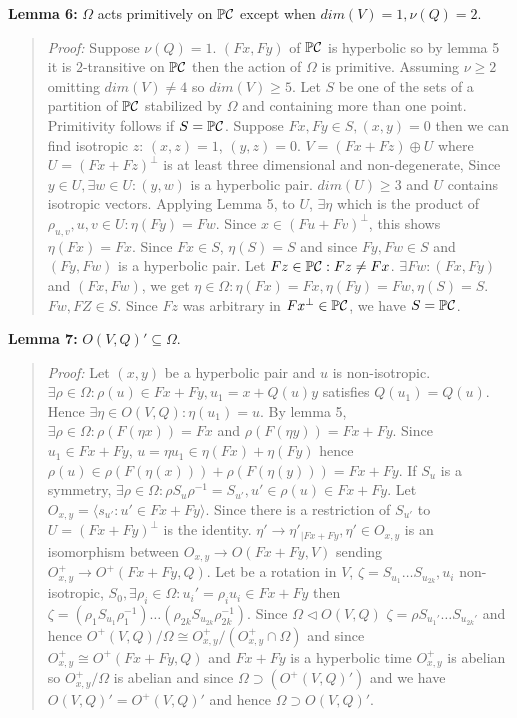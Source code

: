 {\bf Lemma 6:}
$\Omega$ acts primitively on ${\mathbb P}{\cal C}$ except when $dim(V)=1, \nu(Q)=2$.
\begin{quote}
\emph{Proof:}  
Suppose $\nu(Q)=1$.  $(Fx, Fy)$ of ${\mathbb P}{\cal C}$ is hyperbolic so by lemma 5 it is $2$-transitive
on ${\mathbb P}{\cal C}$ then the action of $\Omega$ is primitive.
Assuming $\nu \ge 2$ omitting $dim(V) \ne 4$ so $dim(V) \ge 5$.  Let $S$ be one of the sets
of a partition of ${\mathbb P}{\cal C}$ stabilized by $\Omega$ and containing more than one point.
Primitivity follows if $S={\mathbb P}{\cal C}$.  Suppose $Fx, Fy \in S, (x,y)=0$ then we can find isotropic
$z$: $(x,z)= 1$, $(y, z)=0$.  $V= (Fx + Fz) \oplus U$ where $U= (Fx +Fz)^{\perp}$ is at
least three dimensional and non-degenerate,  Since $y \in U, \exists w \in U: (y, w)$ is
a hyperbolic pair.  $dim(U) \ge 3$ and $U$ contains isotropic vectors.  Applying Lemma 5,
to $U$, $\exists \eta$ which is the product of $\rho_{u,v}, u,v \in U: \eta(Fy)= Fw$.
Since $x \in (Fu + Fv)^{\perp}$, this shows $\eta(Fx)= Fx$.  Since $Fx \in S$,
$\eta(S) = S$ and since $Fy, Fw \in S$ and $(Fy, Fw)$ is  a hyperbolic pair.
Let $Fz \in {\mathbb P}{\cal C}: Fz \ne Fx$.  $\exists Fw: (Fx, Fy)$ and $(Fx, Fw)$, we get
$\eta \in \Omega: \eta(Fx)= Fx, \eta(Fy)= Fw, \eta(S)= S$.
$Fw, FZ \in S$.  Since $Fz$ was arbitrary in $Fx^{\perp} \in {\mathbb P}{\cal C}$, we have $S= {\mathbb P}{\cal C}$.
\end{quote}
{\bf Lemma 7:}
$ O(V,Q)' \subseteq \Omega $.
\begin{quote}
\emph{Proof:}  
Let $(x, y)$ be a hyperbolic pair and $u$ is non-isotropic.  
$\exists \rho \in \Omega: \rho(u) \in Fx + Fy, u_1 = x + Q(u)y$
satisfies $Q(u_1 ) = Q(u)$.  Hence $\exists \eta \in O(V, Q): \eta(u_1 ) =u$.  By lemma 5, 
$\exists \rho \in \Omega: \rho(F(\eta x))= Fx$ and $\rho(F(\eta y)) = Fx + Fy$.
Since $u_1 \in Fx + Fy$, $u= \eta u_1 \in \eta(Fx) + \eta(Fy)$ hence
$\rho(u) \in \rho(F(\eta(x))) + \rho(F(\eta(y)))= Fx + Fy$.  If $S_u$ is a symmetry,
$\exists \rho \in \Omega: \rho S_u \rho^{-1} = S_{u'}, u' \in \rho(u) \in Fx+Fy$.
Let $O_{x,y}= \langle s_{u'}: u' \in Fx + Fy \rangle $.  Since there is a restriction of $S_{u'}$
to $U= (Fx+Fy)^{\perp}$ is the identity.  $\eta' \rightarrow  \eta'_{|Fx+Fy}, \eta' \in O_{x,y}$
is an isomorphism between $O_{x,y} \rightarrow O(Fx+Fy, V)$ sending
$O^+_{x,y} \rightarrow O^+(Fx+Fy, Q)$.  Let be a rotation in $V$, 
$\zeta = S_{u_1} \ldots S_{u_{2k}}, u_i$ non-isotropic, 
$S_0, \exists \rho_i \in \Omega: u_i'= \rho_i u_i \in Fx + Fy$ then
$\zeta = (\rho_1 S_{u_1} \rho_1^{-1})  \ldots (\rho_{2k} S_{u_{2k}}\rho_{2k}^{-1})$.
Since $\Omega \lhd O(V,Q)$
$\zeta = \rho S_{u_1'} \ldots S_{u_{2k}'}$ and hence 
$O^+(V,Q)/ \Omega \cong O^+_{x,y}/(O^+_{x,y} \cap \Omega)$ and since
$O^+_{x,y} \cong O^+(Fx+Fy, Q)$ and $Fx + Fy$ is a hyperbolic time
$O^+_{x,y}$ is abelian so $O^+_{x,y} / \Omega$ is abelian and since
$\Omega \supset (O^+(V,Q)')$ and we have $O(V,Q)' = O^+(V,Q)'$ and hence
$\Omega \supset O(V,Q)'$.
\end{quote}
